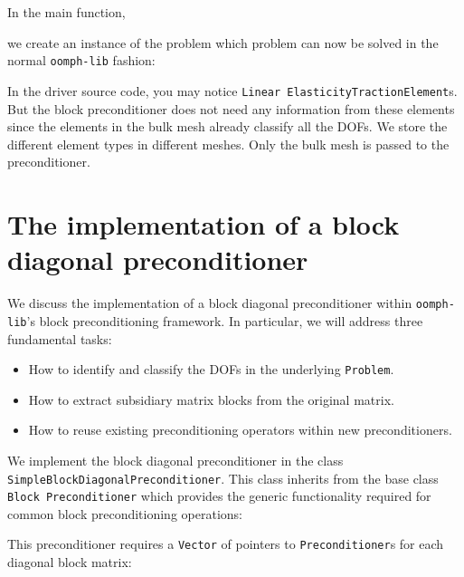 In the main function,
\lstset{numberstyle=\scriptsize,breaklines=true, numbers=left, stepnumber=2, frame=single,basicstyle=\ttfamily\scriptsize, showstringspaces=false, language=C++}

we create an instance of the  problem which problem can now be solved in the
normal \texttt{oomph-\allowbreak lib} fashion:
\lstset{numberstyle=\scriptsize,breaklines=true, numbers=left, stepnumber=2, frame=single,basicstyle=\ttfamily\scriptsize, showstringspaces=false, language=C++}


In the driver source code, you may notice \texttt{Linear\allowbreak
  Elasticity\allowbreak Traction\allowbreak Element}s. But the block
preconditioner does not need any information from these elements since the
elements in the bulk mesh already classify all the DOFs. We store the different
element types in different meshes. Only the bulk mesh is passed to the
preconditioner. 

\section{The implementation of a block diagonal preconditioner\label{sec:the_implementation_of_a_block_diagonal_preconditioner}}

We discuss the implementation of a block diagonal preconditioner within
\texttt{oomph-\allowbreak lib}'s block preconditioning framework. In particular, we will
address three fundamental tasks: 
\begin{itemize} 
  \item How to identify and classify the DOFs in the underlying \texttt{Problem}.  
  \item How to extract subsidiary matrix blocks from the original matrix.
  \item How to reuse existing preconditioning operators within new preconditioners.
\end{itemize}

We implement the block diagonal preconditioner in the class
\texttt{Simple\allowbreak Block\allowbreak Diagonal\allowbreak Preconditioner}.
This class inherits from the base class \texttt{Block\allowbreak
  Preconditioner} which provides the generic functionality required for common
block preconditioning operations:
\lstset{numberstyle=\ttfamily\scriptsize,
        breaklines=true, 
        numbers=left, 
        stepnumber=2, 
        frame=single,
        basicstyle=\ttfamily\scriptsize, 
        showstringspaces=false, 
        language=C++}

This preconditioner requires a \texttt{Vector} of pointers to \texttt{Preconditioner}s for each diagonal block matrix:


